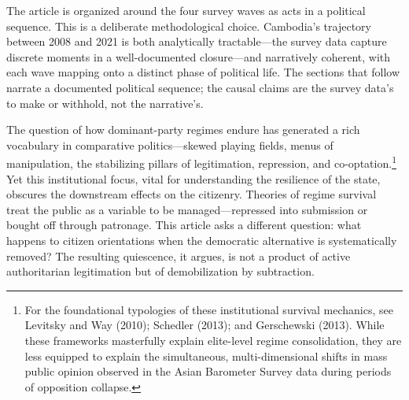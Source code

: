 \documentclass[Review,times,sageh,doublespace]{sagej}
\begin{document}
The article is organized around the four survey waves as acts in a
political sequence. This is a deliberate methodological choice.
Cambodia's trajectory between 2008 and 2021 is both analytically
tractable---the survey data capture discrete moments in a
well-documented closure---and narratively coherent, with each wave
mapping onto a distinct phase of political life. The sections that
follow narrate a documented political sequence; the causal claims are
the survey data's to make or withhold, not the narrative's.

The question of how dominant-party regimes endure has generated a rich
vocabulary in comparative politics---skewed playing fields, menus of
manipulation, the stabilizing pillars of legitimation, repression, and
co-optation.\footnote{For the foundational typologies of these
  institutional survival mechanics, see Levitsky and Way (2010);
  Schedler (2013); and Gerschewski (2013). While these frameworks
  masterfully explain elite-level regime consolidation, they are less
  equipped to explain the simultaneous, multi-dimensional shifts in mass
  public opinion observed in the Asian Barometer Survey data during
  periods of opposition collapse.} Yet this institutional focus, vital
for understanding the resilience of the state, obscures the downstream
effects on the citizenry. Theories of regime survival treat the public
as a variable to be managed---repressed into submission or bought off
through patronage. This article asks a different question: what happens
to citizen orientations when the democratic alternative is
systematically removed? The resulting quiescence, it argues, is not a
product of active authoritarian legitimation but of demobilization by
subtraction.
\end{document}
